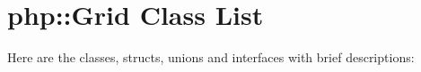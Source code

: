 \section{php::Grid Class List}
Here are the classes, structs, unions and interfaces with brief descriptions:\begin{CompactList}
\item{}
\end{CompactList}
